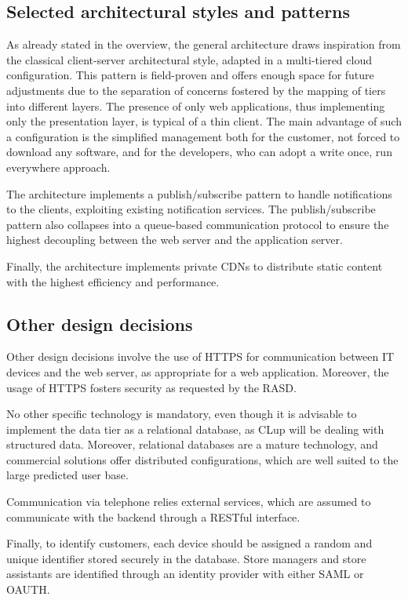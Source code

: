 \documentclass[../../main.tex]{subfiles}
\begin{document}
\subsection{Selected architectural styles and patterns}


    As already stated in the overview, the general architecture draws inspiration from the classical client-server architectural style, adapted in a multi-tiered cloud configuration.  
    This pattern is field-proven and offers enough space for future adjustments due to the separation of concerns fostered by the mapping of tiers into different layers.
    The presence of only web applications, thus implementing only the presentation layer, is typical of a thin client. The main advantage of such a configuration is the simplified management both for the customer, not forced to download any software, and for the developers, who can adopt a write once, run everywhere approach.

    The architecture implements a publish/subscribe pattern to handle notifications to the clients, exploiting existing notification services. 
    The publish/subscribe pattern also collapses into a queue-based communication protocol to ensure the highest decoupling between the web server and the application server.

    Finally, the architecture implements private CDNs to distribute static content with the highest efficiency and performance.

\subsection{Other design decisions}


    Other design decisions involve the use of HTTPS for communication between IT devices and the web server, as appropriate for a web application. 
    Moreover, the usage of HTTPS fosters security as requested by the RASD.

    No other specific technology is mandatory, even though it is advisable to implement the data tier as a relational database, 
    as CLup will be dealing with structured data. Moreover, relational databases are a mature technology, and commercial solutions offer distributed configurations, 
    which are well suited to the large predicted user base.

    Communication via telephone relies external services, which are assumed to communicate with the backend through a RESTful interface.

    Finally, to identify customers, each device should be assigned a random and unique identifier stored securely in the database. Store managers and store assistants are identified through
    an identity provider with either SAML or OAUTH. 
\end{document}
